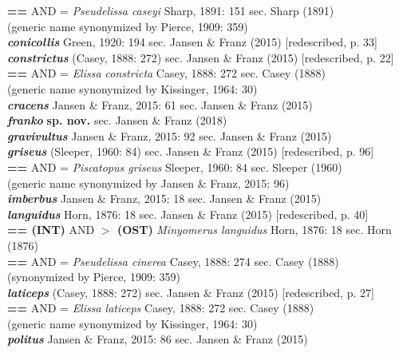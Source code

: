 \documentclass[fleqn,10pt,lineno]{wlpeerj} %
\begin{document}
\begin{tabbing}
				\> \> \textbf{==} AND = \textit{Pseudelissa caseyi} Sharp, 1891: 151 sec. Sharp (1891)\\
				\> \> \> (generic name synonymized by Pierce, 1909: 359)\\
			\> \textbf{\textit{conicollis}} Green, 1920: 194 sec. Jansen \& Franz (2015) [redescribed, p. 33]\\
			\> \textbf{\textit{constrictus}} (Casey, 1888: 272) sec. Jansen \& Franz (2015) [redescribed, p. 22]\\
				\> \> \textbf{==} AND = \textit{Elissa constricta} Casey, 1888: 272 sec. Casey (1888)\\
				\> \> \> (generic name synonymized by Kissinger, 1964: 30)\\
			\> \textbf{\textit{cracens}} Jansen \& Franz, 2015: 61 sec. Jansen \& Franz (2015)\\
			\> \textbf{\textit{franko}} \textbf{sp. nov.} sec. Jansen \& Franz (2018)\\
			\>\textbf{ \textit{gravivultus}} Jansen \& Franz, 2015: 92 sec. Jansen \& Franz (2015)\\
			\> \textbf{\textit{griseus}} (Sleeper, 1960: 84) sec. Jansen \& Franz (2015) [redescribed, p. 96]\\
				\> \> \textbf{==} AND = \textit{Piscatopus griseus} Sleeper, 1960: 84 sec. Sleeper (1960)\\
				\> \> \> (generic name synonymized by Jansen \& Franz, 2015: 96)\\
			\> \textbf{\textit{imberbus}} Jansen \& Franz, 2015: 18 sec. Jansen \& Franz (2015)\\
			\> \textbf{\textit{languidus}} Horn, 1876: 18 sec. Jansen \& Franz (2015) [redescribed, p. 40]\\
				\> \> \textbf{== (INT)} AND \textbf{$>$ (OST)} \textit{Minyomerus languidus} Horn, 1876: 18 sec. Horn (1876)\\
				\> \> \textbf{==} AND = \textit{Pseudelissa cinerea} Casey, 1888: 274 sec. Casey (1888)\\
				\> \> \> (synonymized by Pierce, 1909: 359)\\
			\> \textbf{\textit{laticeps}} (Casey, 1888: 272) sec. Jansen \& Franz (2015) [redescribed, p. 27]\\
				\> \> \textbf{==} AND = \textit{Elissa laticeps} Casey, 1888: 272 sec. Casey (1888)\\
				\> \> \> (generic name synonymized by Kissinger, 1964: 30)\\
			\> \textbf{\textit{politus}} Jansen \& Franz, 2015: 86 sec. Jansen \& Franz (2015)\\

\end{tabbing}
\end{document}
